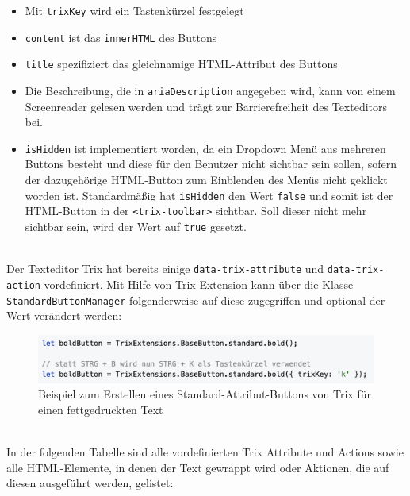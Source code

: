 \begin{itemize}
	\item Mit \texttt{trixKey} wird ein Tastenkürzel festgelegt 
	\item \texttt{content} ist das \texttt{innerHTML} des Buttons
	\item \texttt{title} spezifiziert das gleichnamige HTML-Attribut des Buttons
	\item Die Beschreibung, die in \texttt{ariaDescription} angegeben wird, kann von einem Screenreader gelesen 
		werden und 
		trägt zur Barrierefreiheit des Texteditors bei.
	\item \texttt{isHidden} ist implementiert worden, da ein Dropdown Menü aus mehreren Buttons besteht und 
		diese für den Benutzer nicht sichtbar sein sollen, sofern der dazugehörige HTML-Button zum Einblenden 
		des Menüs nicht geklickt worden ist. Standardmäßig hat \texttt{isHidden} den Wert \texttt{false} und somit 
		ist der HTML-Button in der \texttt{<trix-toolbar>} sichtbar. Soll dieser nicht mehr sichtbar sein, wird der 
		Wert auf 
		\texttt{true} gesetzt.
\end{itemize}

\mbox{}\\
Der Texteditor Trix hat bereits einige \texttt{data-trix-attribute} und \texttt{data-trix-action} vordefiniert. Mit Hilfe von 
Trix Extension kann über die Klasse \texttt{StandardButtonManager} folgenderweise auf diese zugegriffen und optional 
der Wert verändert werden:

\begin{figure}[H]
\begin{center}
	\includegraphics[scale=.7]{images/standard-button.png}
\end{center}
	\caption{Beispiel zum Erstellen eines Standard-Attribut-Buttons von Trix für einen fettgedruckten Text}
\end{figure}

\mbox{}\\
In der folgenden Tabelle sind alle vordefinierten Trix Attribute und Actions sowie alle HTML-Elemente, in denen der Text gewrappt wird oder Aktionen, die auf diesen ausgeführt werden, gelistet:

